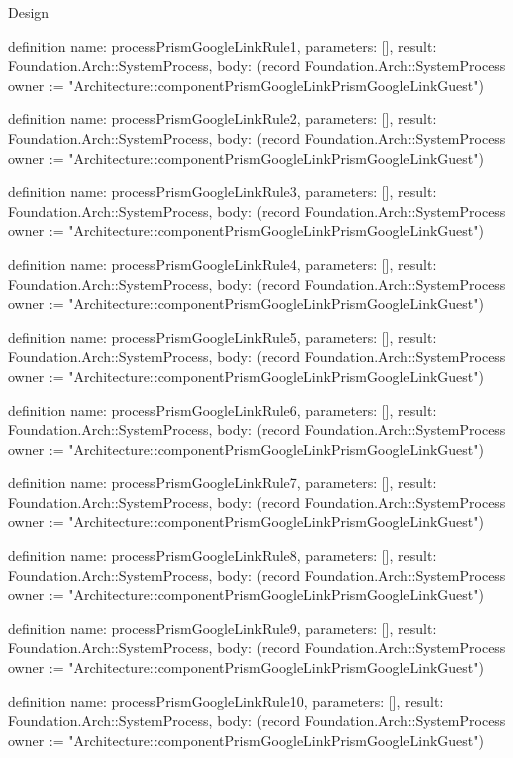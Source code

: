 \begin{lexlean}{Design}
\begin{semanticmodule}
definition{
  name: processPrismGoogleLinkRule1,
  parameters: [],
  result: Foundation.Arch::SystemProcess,
  body: (record Foundation.Arch::SystemProcess {owner := "Architecture::componentPrismGoogleLinkPrismGoogleLinkGuest"})
}

definition{
  name: processPrismGoogleLinkRule2,
  parameters: [],
  result: Foundation.Arch::SystemProcess,
  body: (record Foundation.Arch::SystemProcess {owner := "Architecture::componentPrismGoogleLinkPrismGoogleLinkGuest"})
}

definition{
  name: processPrismGoogleLinkRule3,
  parameters: [],
  result: Foundation.Arch::SystemProcess,
  body: (record Foundation.Arch::SystemProcess {owner := "Architecture::componentPrismGoogleLinkPrismGoogleLinkGuest"})
}

definition{
  name: processPrismGoogleLinkRule4,
  parameters: [],
  result: Foundation.Arch::SystemProcess,
  body: (record Foundation.Arch::SystemProcess {owner := "Architecture::componentPrismGoogleLinkPrismGoogleLinkGuest"})
}

definition{
  name: processPrismGoogleLinkRule5,
  parameters: [],
  result: Foundation.Arch::SystemProcess,
  body: (record Foundation.Arch::SystemProcess {owner := "Architecture::componentPrismGoogleLinkPrismGoogleLinkGuest"})
}

definition{
  name: processPrismGoogleLinkRule6,
  parameters: [],
  result: Foundation.Arch::SystemProcess,
  body: (record Foundation.Arch::SystemProcess {owner := "Architecture::componentPrismGoogleLinkPrismGoogleLinkGuest"})
}

definition{
  name: processPrismGoogleLinkRule7,
  parameters: [],
  result: Foundation.Arch::SystemProcess,
  body: (record Foundation.Arch::SystemProcess {owner := "Architecture::componentPrismGoogleLinkPrismGoogleLinkGuest"})
}

definition{
  name: processPrismGoogleLinkRule8,
  parameters: [],
  result: Foundation.Arch::SystemProcess,
  body: (record Foundation.Arch::SystemProcess {owner := "Architecture::componentPrismGoogleLinkPrismGoogleLinkGuest"})
}

definition{
  name: processPrismGoogleLinkRule9,
  parameters: [],
  result: Foundation.Arch::SystemProcess,
  body: (record Foundation.Arch::SystemProcess {owner := "Architecture::componentPrismGoogleLinkPrismGoogleLinkGuest"})
}

definition{
  name: processPrismGoogleLinkRule10,
  parameters: [],
  result: Foundation.Arch::SystemProcess,
  body: (record Foundation.Arch::SystemProcess {owner := "Architecture::componentPrismGoogleLinkPrismGoogleLinkGuest"})
}


\end{semanticmodule}
\end{lexlean}

